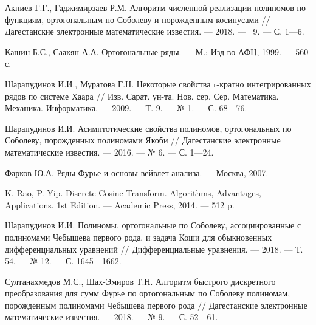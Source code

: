 \begin{thebibliography}{11}
{Акниев Г.Г., Гаджимирзаев Р.М.} Алгоритм численной реализации полиномов по функциям, ортогональным по Соболеву и порожденным косинусами // Дагестанские электронные математические известия. --- 2018. --- \No\ 9. --- С. 1---6.












Кашин Б.С., Саакян А.А. Ортогональные ряды. --- М.: Изд-во АФЦ, 1999. --- 560 с.



Шарапудинов И.И., Муратова Г.Н. Некоторые свойства r-кратно интегрированных рядов по системе Хаара // Изв. Сарат. ун-та. Нов. сер. Сер. Математика. Механика. Информатика. --- 2009. --- Т. 9. --- № 1. --- С. 68---76.




Шарапудинов И.И.  Асимптотические свойства полиномов, ортогональных по Соболеву, порожденных полиномами Якоби // Дагестанские электронные математические известия. --- 2016. --- № 6. --- С. 1---24.



Фарков Ю.А. Ряды Фурье и основы вейвлет-анализа. --- Москва, 2007.




K. Rao, P. Yip. Discrete Cosine Transform. Algorithms, Advantages, Applications. 1st Edition. --- Academic Press, 2014. --- 512 p.




Шарапудинов И.И. Полиномы, ортогональные по Соболеву, ассоциированные с полиномами Чебышева первого рода, и задача Коши для обыкновенных дифференциальных уравнений // Дифференциальные уравнения. --- 2018. --- Т. 54. --- № 12. --- С. 1645---1662.



Султанахмедов М.С., Шах-Эмиров Т.Н. Алгоритм быстрого дискретного преобразования для сумм Фурье по ортогональным по Соболеву полиномам, порожденным полиномами Чебышева первого рода // Дагестанские электронные математические известия. --- 2018. --- № 9. --- С. 52---61.



\end{thebibliography}
